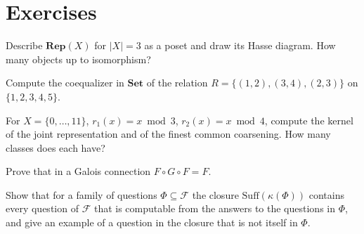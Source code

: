 \section*{Exercises}

\begin{exercise}
Describe $\mathbf{Rep}(X)$ for $|X|=3$ as a poset and draw its Hasse diagram. How many objects up to isomorphism?
\end{exercise}

\begin{exercise}
Compute the coequalizer in $\mathbf{Set}$ of the relation $R=\{(1,2),(3,4),(2,3)\}$ on $\{1,2,3,4,5\}$.
\end{exercise}

\begin{exercise}
For $X=\{0,\dots,11\}$, $r_1(x)=x\bmod3$, $r_2(x)=x\bmod4$, compute the kernel of the joint representation and of the finest common coarsening. How many classes does each have?
\end{exercise}

\begin{exercise}
Prove that in a Galois connection $F\circ G\circ F=F$.
\end{exercise}

\begin{exercise}
Show that for a family of questions $\Phi\subseteq\mathcal F$ the closure $\mathrm{Suff}(\kappa(\Phi))$ contains every question of $\mathcal F$ that is computable from the answers to the questions in $\Phi$, and give an example of a question in the closure that is not itself in $\Phi$.
\end{exercise}
